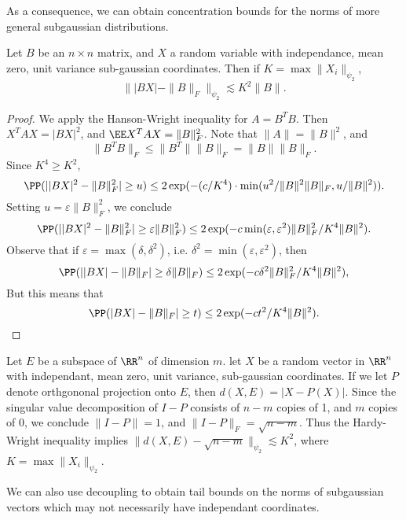 As a consequence, we can obtain concentration bounds for the norms of more general subgaussian distributions.

\begin{theorem}
    Let $B$ be an $n \times n$ matrix, and $X$ a random variable with independance, mean zero, unit variance sub-gaussian coordinates. Then if $K = \max \| X_i \|_{\psi_2}$,
    \[ \| |BX| - \| B \|_F \|_{\psi_2} \lesssim K^2 \| B \|. \]
\end{theorem}
\begin{proof}
    We apply the Hanson-Wright inequality for $A = B^TB$. Then $X^TAX = |BX|^2$, and $\EE X^TAX = \| B \|_F^2$. Note that $\| A \| = \| B \|^2$, and
    \[ \| B^T B \|_F \leq \| B^T \| \| B \|_F = \| B \| \| B \|_F. \]
    Since $K^4 \geq K^2$,
    \[ \PP(| |BX|^2 - \| B \|_F^2 | \geq u) \leq 2 \exp(- (c/K^4) \cdot \min(u^2/\| B \|^2 \| B \|_F, u / \| B \|^2)). \]
    Setting $u = \varepsilon \| B \|_F^2$, we conclude
    \[ \PP(| |BX|^2 - \| B \|_F^2 | \geq \varepsilon \| B \|_F^2) \leq 2 \exp(-c \min(\varepsilon,\varepsilon^2) \| B \|_F^2 / K^4 \| B \|^2). \]
    Observe that if $\varepsilon = \max(\delta, \delta^2)$, i.e. $\delta^2 = \min(\varepsilon, \varepsilon^2)$, then
    \[ \PP(||BX| - \| B \|_F| \geq \delta \| B \|_F) \leq 2 \exp(-c\delta^2 \| B \|_F^2 / K^4 \| B \|^2), \]
    But this means that
    \[ \PP(|BX| - \| B \|_F| \geq t) \leq 2 \exp(-c t^2 / K^4 \| B \|^2). \qedhere \]
\end{proof}

\begin{example}
	Let $E$ be a subspace of $\RR^n$ of dimension $m$. let $X$ be a random vector in $\RR^n$ with independant, mean zero, unit variance, sub-gaussian coordinates. If we let $P$ denote orthgononal projection onto $E$, then $d(X,E) = |X - P(X)|$. Since the singular value decomposition of $I - P$ consists of $n - m$ copies of 1, and $m$ copies of 0, we conclude $\| I - P \| = 1$, and $\| I - P \|_F = \sqrt{n - m}$. Thus the Hardy-Wright inequality implies $\| d(X,E) - \sqrt{n-m} \|_{\psi_2} \lesssim K^2$, where $K = \max \| X_i \|_{\psi_2}$.
\end{example}

We can also use decoupling to obtain tail bounds on the norms of subgaussian vectors which may not necessarily have independant coordinates.

